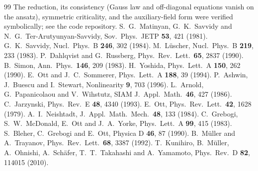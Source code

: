 \documentclass[11pt,a4paper]{article}
\begin{document}
\begin{thebibliography}{99}
 The reduction, its consistency (Gauss law and off-diagonal equations vanish on the ansatz), symmetric criticality, and the auxiliary-field form were verified symbolically; see the code repository.
 S.~G.~Matinyan, G.~K.~Savvidy and N.~G.~Ter-Arutyunyan-Savvidy, Sov.\ Phys.\ JETP {\bf 53}, 421 (1981).
 G.~K.~Savvidy, Nucl.\ Phys.\ B {\bf 246}, 302 (1984).
 M.~L\"uscher, Nucl.\ Phys.\ B {\bf 219}, 233 (1983).
 P.~Dahlqvist and G.~Russberg, Phys.\ Rev.\ Lett.\ {\bf 65}, 2837 (1990).
 B.~Simon, Ann.\ Phys.\ {\bf 146}, 209 (1983).
 H.~Yoshida, Phys.\ Lett.\ A {\bf 150}, 262 (1990).
 E.~Ott and J.~C.~Sommerer, Phys.\ Lett.\ A {\bf 188}, 39 (1994).
 P.~Ashwin, J.~Buescu and I.~Stewart, Nonlinearity {\bf 9}, 703 (1996).
 L.~Arnold, G.~Papanicolaou and V.~Wihstutz, SIAM J.\ Appl.\ Math.\ {\bf 46}, 427 (1986).
 C.~Jarzynski, Phys.\ Rev.\ E {\bf 48}, 4340 (1993).
 E.~Ott, Phys.\ Rev.\ Lett.\ {\bf 42}, 1628 (1979).
 A.~I.~Neishtadt, J.\ Appl.\ Math.\ Mech.\ {\bf 48}, 133 (1984).
 C.~Grebogi, S.~W.~McDonald, E.~Ott and J.~A.~Yorke, Phys.\ Lett.\ A {\bf 99}, 415 (1983).
 S.~Bleher, C.~Grebogi and E.~Ott, Physica D {\bf 46}, 87 (1990).
 B.~M\"uller and A.~Trayanov, Phys.\ Rev.\ Lett.\ {\bf 68}, 3387 (1992).
 T.~Kunihiro, B.~M\"uller, A.~Ohnishi, A.~Sch\"afer, T.~T.~Takahashi and A.~Yamamoto, Phys.\ Rev.\ D {\bf 82}, 114015 (2010).
\end{thebibliography}
\end{document}
